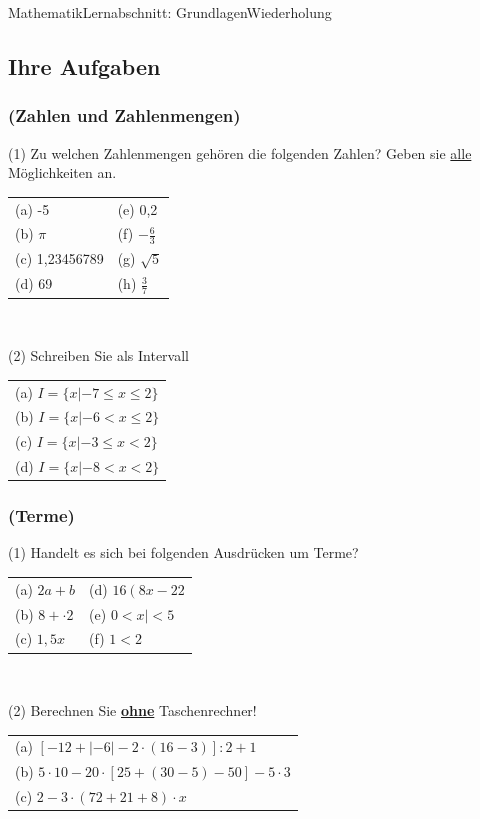 \documentclass[11pt,twocolumn,oneside,openany,headings=optiontotoc,11pt,numbers=noenddot]{article}
\begin{document}
\begin{worksheet}{Mathematik}{Lernabschnitt: Grundlagen}{Wiederholung}
		\subsection{Ihre Aufgaben}
		\subsubsection*{(Zahlen und Zahlenmengen)}
		(1) Zu welchen Zahlenmengen gehören die folgenden Zahlen? Geben sie \underline{alle} Möglichkeiten an.\\
		\begin{tabularx}{0.48\textwidth}{XX}
			(a) -5 & (e) 0,2\\
			(b) $\pi$ & (f) $-\frac{6}{3}$\\
			(c) 1,23456789 & (g) $\sqrt{5}$\\
			(d) 69 & (h) $\frac{3}{7}$
		\end{tabularx}\\
		\par\bigskip\noindent
		(2) Schreiben Sie als Intervall\\
		\begin{tabularx}{0.48\textwidth}{X}
			(a) \(I = \{x|-7\leq x\leq 2\}\)\\
			(b) \(I = \{x|-6< x\leq 2\}\)\\
			(c) \(I = \{x|-3\leq x< 2\}\)\\
			(d) \(I = \{x|-8< x< 2\}\)
		\end{tabularx}
		\subsubsection*{(Terme)}
		(1) Handelt es sich bei folgenden Ausdrücken um Terme?\\
		\begin{tabularx}{0.5\textwidth}{XX}
			(a) \(2a+b\) & (d) \(16\left(8x-22\right.\)\\
			(b) \(8 + \cdot{} 2\) & (e) \(0 < x| <5\)\\
			(c) \(1,5x\) & (f) \(1<2\)
		\end{tabularx}\\
		\par\bigskip\noindent
		(2) Berechnen Sie \underline{\textbf{ohne}} Taschenrechner!\\
		\begin{tabularx}{0.5\textwidth}{X}
			(a) \(\left[-12 + |-6| -2\cdot{}(16-3)\right]:2 + 1\)\\
			(b) \(5\cdot{}10 -20\cdot\left[25+(30-5)-50\right]-5\cdot{}3\)\\
			(c) \(2-3\cdot{}(72+21+8)\cdot{}x\)
		\end{tabularx}

\end{worksheet}
\end{document}
